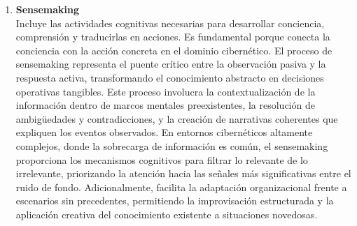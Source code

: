 \begin{enumerate}
\item \textbf{Sensemaking} \\
Incluye las actividades cognitivas necesarias para desarrollar conciencia, comprensión y traducirlas en acciones. Es fundamental porque conecta la conciencia con la acción concreta en el dominio cibernético. El proceso de sensemaking representa el puente crítico entre la observación pasiva y la respuesta activa, transformando el conocimiento abstracto en decisiones operativas tangibles. Este proceso involucra la contextualización de la información dentro de marcos mentales preexistentes, la resolución de ambigüedades y contradicciones, y la creación de narrativas coherentes que expliquen los eventos observados. En entornos cibernéticos altamente complejos, donde la sobrecarga de información es común, el sensemaking proporciona los mecanismos cognitivos para filtrar lo relevante de lo irrelevante, priorizando la atención hacia las señales más significativas entre el ruido de fondo. Adicionalmente, facilita la adaptación organizacional frente a escenarios sin precedentes, permitiendo la improvisación estructurada y la aplicación creativa del conocimiento existente a situaciones novedosas.
\end{enumerate}

